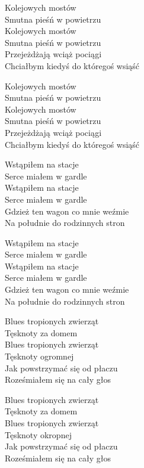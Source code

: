 
\begin{text}
    Kolejowych mostów\\
    Smutna pieśń w powietrzu\\
    Kolejowych mostów\\
    Smutna pieśń w powietrzu\\
    Przejeżdżają wciąż pociągi\\
    Chciałbym kiedyś do któregoś wsiąść

    Kolejowych mostów\\
    Smutna pieśń w powietrzu\\
    Kolejowych mostów\\
    Smutna pieśń w powietrzu\\
    Przejeżdżają wciąż pociągi\\
    Chciałbym kiedyś do któregoś wsiąść

    Wstąpiłem na stacje\\
    Serce miałem w gardle\\
    Wstąpiłem na stacje\\
    Serce miałem w gardle\\
    Gdzież ten wagon co mnie weźmie\\
    Na południe do rodzinnych stron

    Wstąpiłem na stacje\\
    Serce miałem w gardle\\
    Wstąpiłem na stacje\\
    Serce miałem w gardle\\
    Gdzież ten wagon co mnie weźmie\\
    Na południe do rodzinnych stron

    Blues tropionych zwierząt\\
    Tęsknoty za domem\\
    Blues tropionych zwierząt\\
    Tęsknoty ogromnej\\
    Jak powstrzymać się od płaczu\\
    Roześmiałem się na cały głos

    Blues tropionych zwierząt\\
    Tęsknoty za domem\\
    Blues tropionych zwierząt\\
    Tęsknoty okropnej\\
    Jak powstrzymać się od płaczu\\
    Roześmiałem się na cały głos
\end{text}
\begin{chord}

\end{chord}